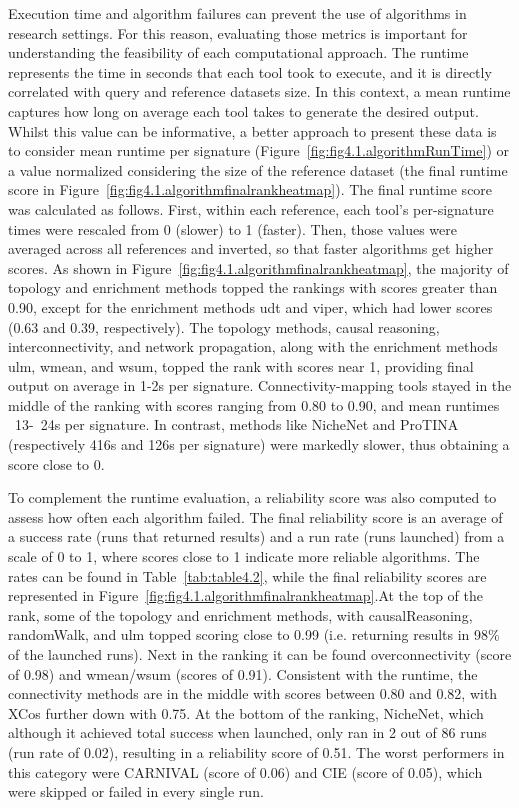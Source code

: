 Execution time and algorithm failures can prevent the use of algorithms in research settings. For this reason, evaluating those metrics is important for understanding the feasibility of each computational approach. The runtime represents the time in seconds that each tool took to execute, and it is directly correlated with query and reference datasets size. In this context, a mean runtime captures how long on average each tool takes to generate the desired output. Whilst this value can be informative, a better approach to present these data is to consider mean runtime per signature (Figure~\ref{fig:fig4.1.algorithmRunTime}) or a value normalized considering the size of the reference dataset (the final runtime score in Figure~\ref{fig:fig4.1.algorithmfinalrankheatmap}). The final runtime score was calculated as follows. First, within each reference, each tool's per-signature times were rescaled from 0 (slower) to 1 (faster). Then, those values were averaged across all references and inverted, so that faster algorithms get higher scores. As shown in Figure~\ref{fig:fig4.1.algorithmfinalrankheatmap}, the majority of topology and enrichment methods topped the rankings with scores greater than 0.90, except for the enrichment methods udt and viper, which had lower scores (0.63 and 0.39, respectively). The topology methods, causal reasoning, interconnectivity, and network propagation, along with the enrichment methods ulm, wmean, and wsum, topped the rank with scores near 1, providing final output on average in 1-2s per signature. Connectivity-mapping tools stayed in the middle of the ranking with scores ranging from 0.80 to 0.90, and mean runtimes ~13-~24s per signature. In contrast, methods like NicheNet and \gls{ProTINA} (respectively 416s and 126s per signature) were markedly slower, thus obtaining a score close to 0.

To complement the runtime evaluation, a reliability score was also computed to assess how often each algorithm failed. The final reliability score is an average of a success rate (runs that returned results) and a run rate (runs launched) from a scale of 0 to 1, where scores close to 1 indicate more reliable algorithms. The rates can be found in Table~\ref{tab:table4.2}, while the final reliability scores are represented in Figure~\ref{fig:fig4.1.algorithmfinalrankheatmap}.At the top of the rank, some of the topology and enrichment methods, with  causalReasoning, randomWalk, and ulm topped scoring close to 0.99 (i.e. returning results in 98\% of the launched runs). Next in the ranking it can be found overconnectivity (score of 0.98) and wmean/wsum (scores of 0.91). Consistent with the runtime, the connectivity methods are in the middle with scores between 0.80 and 0.82, with XCos further down with 0.75. At the bottom of the ranking, NicheNet, which although it achieved total success when launched, only ran in 2 out of 86 runs (run rate of 0.02), resulting in a reliability score of 0.51. The worst performers in this category were \gls{CARNIVAL} (score of 0.06) and \gls{CIE} (score of 0.05), which were skipped or failed in every single run. 

